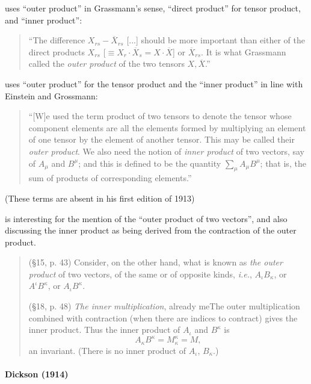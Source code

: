 \cite[p. 25]{Murnaghan1922} uses ``outer product'' in Grassmann's sense, ``direct product'' for tensor product, and ``inner product'':
\begin{quote}
``The difference $X_{rs} - \overline X_{rs}$ [...] should be more important than either of the direct products $X_{rs}$ [$\equiv X_r \cdot \overline X_s = X \cdot \overline X$] or $\overline X_{rs}$. It is what Grassmann called the \textit{outer product} of the two tensors $X, \overline X$.''
\end{quote}

\cite[p. 87]{Carmichael1920} uses ``outer product'' for the tensor product and the ``inner product'' in line with Einstein and Grossmann:
\begin{quote}
``[W]e used the term product of two tensors to denote the tensor whose component elements are all the elements formed by multiplying an element of one tensor by the element of another tensor. This may be called their \textit{outer product}. We also need the notion of \textit{inner product} of two vectors, say of $A_\mu$ and $B^\mu$; and this is defined to be the quantity $\sum_\mu A_\mu B^\mu$; that is, the sum of products of corresponding elements.''
\end{quote}
(These terms are absent in his first edition of 1913)

\cite{Silberstein1922} is interesting for the mention of the ``outer product of two vectors'', and also discussing the inner product as being derived from the contraction of the outer product.
\begin{quote}
(\S 15, p. 43) Consider, on the other hand, what is known as \textit{the outer product} of two vectors, of the same or of opposite kinds, \textit{i.e.}, $A_\iota B_\kappa$, or $A^\iota B^\kappa$, or $A_\iota B^\kappa$.

(\S 18, p. 48) \textit{The inner multiplication}, already meThe outer multiplication combined with contraction (when there are indices to contract) gives the inner product. Thus the inner product of $A_\iota$ and $B^\kappa$ is
\[
A_\kappa B^\kappa = M^\kappa_\kappa = M,
\]
an invariant. (There is no inner product of $A_\iota$, $B_\kappa$.)
\end{quote}



\paragraph{Dickson (1914)~\cite{Dickson1914}}

